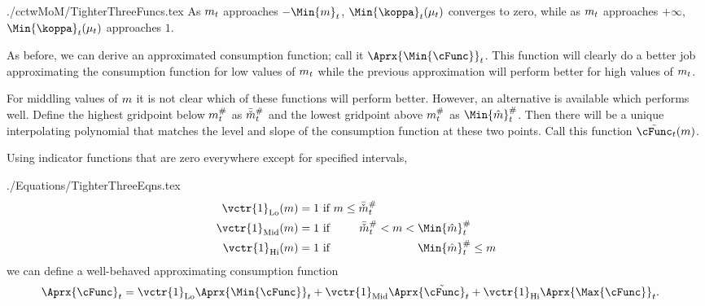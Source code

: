 \documentclass[SolvingMicroDSOPs]{subfiles}
\begin{document}
\begin{verbatimwrite}{./cctwMoM/TighterThreeFuncs.tex}
  As $m_{t}$ approaches
  $-\Min{m}_{\prd}$, $\Min{\koppa}_{\prd}(\mu_{\prd})$ converges to zero, while as $m_{t}$
  approaches $+\infty$, $\Min{\koppa}_{\prd}(\mu_{\prd})$ approaches $1$.

  As before, we can derive an approximated consumption function; call it $\Aprx{\Min{\cFunc}}_{\prd}$.  This function will clearly do a better job approximating the consumption function for low values of $m_{t}$ while the previous approximation will perform better for high values of $m_{t}$.

  For middling values of $m$ it is not clear which of these functions will perform better.  However, an alternative is available which performs well.  Define the highest gridpoint below $m_{t}^{\#}$ as $\bar{\check{m}}_{t}^{\#}$ and the lowest gridpoint above $m_{t}^{\#}$ as $\Min{\hat{\mNrm}}_{\prd}^{\#}$.  Then there will be a unique interpolating polynomial that matches the level and slope of the consumption function at these two points.  Call this function $\tilde{\cFunc}_{\prd}(\mNrm)$.

  Using indicator functions that are zero everywhere except for specified intervals,
\end{verbatimwrite}
\unskip
\begin{verbatimwrite}{./Equations/TighterThreeEqns.tex}
  \begin{equation*}\begin{gathered}\begin{aligned}
        \vctr{1}_{\text{Lo}}(\mNrm)  & = 1 \text{~if $          \mNrm \leq  \bar{\check{\mNrm}}_{\prd}^{\#} \phantom{< \mNrm <   \Min{\hat{\mNrm}}_{\prd}^{\#}          \leq \mNrm}$}
        \\  \vctr{1}_{\text{Mid}}(\mNrm)  & = 1 \text{~if $\phantom{ \mNrm \leq}~ \bar{\check{\mNrm}}_{\prd}^{\#}          < \mNrm <   \Min{\hat{\mNrm}}_{\prd}^{\#} \phantom{\leq \mNrm}$}
        \\  \vctr{1}_{\text{Hi}}(\mNrm)  & = 1 \text{~if $\phantom{ \mNrm \leq  ~\bar{\check{\mNrm}}_{\prd}^{\#}          < \mNrm < } \Min{\hat{\mNrm}}_{\prd}^{\#}           \leq \mNrm$}
      \end{aligned}\end{gathered}\end{equation*}
  we can define a well-behaved approximating consumption function
  \begin{equation}\begin{gathered}\begin{aligned}
        \Aprx{\cFunc}_{\prd}  & = \vctr{1}_{\text{Lo}} \Aprx{\Min{\cFunc}}_{\prd} + \vctr{1}_{\text{Mid}} \Aprx{\tilde{\cFunc}}_{\prd}+\vctr{1}_{\text{Hi}} \Aprx{\Max{\cFunc}}_{\prd}.
      \end{aligned}\end{gathered}\end{equation}
\end{verbatimwrite}
\unskip
\end{document}
